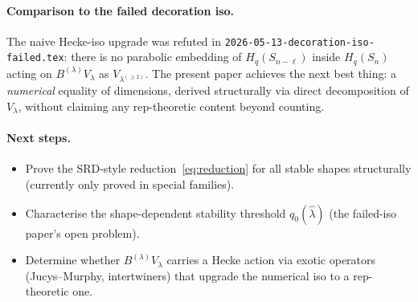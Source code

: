 \documentclass[11pt]{article}
\theoremstyle{definition}
\begin{document}
\paragraph{Comparison to the failed decoration iso.}
The naive Hecke-iso upgrade was refuted in
\texttt{2026-05-13-decoration-iso-failed.tex}: there is no parabolic
embedding of $H_q(S_{n-\ell})$ inside $H_q(S_n)$ acting on
$B^{(\lambda)} V_\lambda$ as $V_{\lambda^{(\ge 2)}}$. The present
paper achieves the next best thing: a \emph{numerical} equality of
dimensions, derived structurally via direct decomposition of
$V_\lambda$, without claiming any rep-theoretic content beyond
counting.

\paragraph{Next steps.}
\begin{itemize}[leftmargin=2em,topsep=0.2em,itemsep=0.1em]
\item Prove the SRD-style reduction~\eqref{eq:reduction} for all
   stable shapes structurally (currently only proved in special
   families).
\item Characterise the shape-dependent stability threshold
   $q_0(\widehat\lambda)$ (the failed-iso paper's open problem).
\item Determine whether $B^{(\lambda)} V_\lambda$ carries a Hecke
   action via exotic operators (Jucys--Murphy, intertwiners) that
   upgrade the numerical iso to a rep-theoretic one.
\end{itemize}
\end{document}
